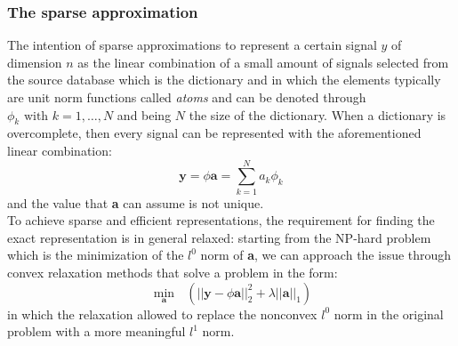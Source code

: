 \subsubsection{The sparse approximation}
The intention of sparse approximations to represent a certain signal $y$ of dimension $n$ as the linear combination of a small amount of signals selected from the source database which is the dictionary and in which the elements typically are unit norm functions called \textit{atoms} and can be denoted through $\phi_k \text{ with } k = 1,\dots, N$ and being $N$ the size of the dictionary. When a dictionary is overcomplete, then every signal can be represented with the aforementioned linear combination:
\begin{equation}
\textbf{y} = \textbf{$\phi$}\textbf{a} = \sum_{k=1}^{N}a_k\phi_k
\end{equation}
and the value that \textbf{a} can assume is not unique.\\
To achieve sparse and efficient representations, the requirement for finding the exact representation is in general relaxed: starting from the NP-hard problem which is the minimization of the $l^0$ norm of \textbf{a}, we can approach the issue through convex relaxation methods that solve a problem in the form:
\begin{equation}
\min_\textbf{a} \text{ } (|| \textbf{y} - \textbf{$\phi$a} ||_2^2 + \textbf{$\lambda$}||\textbf{a}||_1)
\end{equation}
in which the relaxation allowed to replace the nonconvex $l^0$ norm in the original problem with a more meaningful $l^1$ norm. \cite{Tosic2011}

